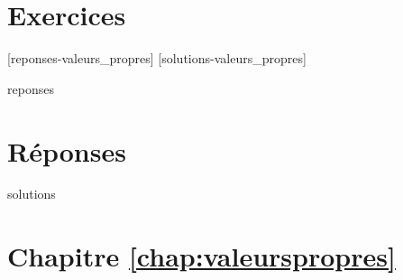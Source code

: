 \section{Exercices}
\label{chap:valeurspropres:exercices}


[reponses-valeurs_propres]
[solutions-valeurs_propres]

\begin{Filesave}{reponses}
\bigskip
\section*{Réponses}

\end{Filesave}

\begin{Filesave}{solutions}
\section*{Chapitre \ref{chap:valeurspropres}}

\end{Filesave}



